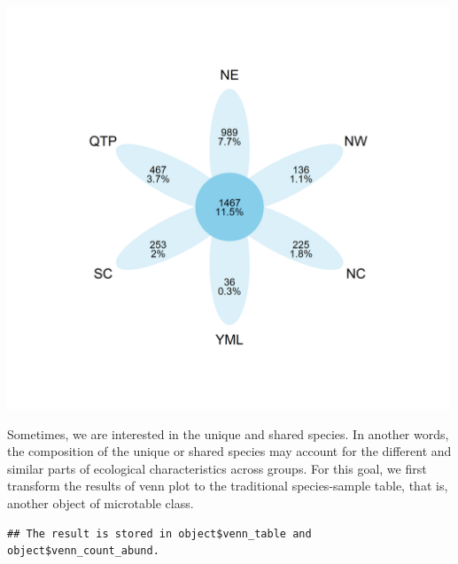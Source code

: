 \documentclass[
]{book}
\newenvironment{Shaded}{\begin{snugshade}}{\end{snugshade}}
\newcommand{\AttributeTok}[1]{\textcolor[rgb]{0.77,0.63,0.00}{#1}}
\newcommand{\CommentTok}[1]{\textcolor[rgb]{0.56,0.35,0.01}{\textit{#1}}}
\newcommand{\ConstantTok}[1]{\textcolor[rgb]{0.00,0.00,0.00}{#1}}
\newcommand{\FunctionTok}[1]{\textcolor[rgb]{0.00,0.00,0.00}{#1}}
\newcommand{\NormalTok}[1]{#1}
\newcommand{\OtherTok}[1]{\textcolor[rgb]{0.56,0.35,0.01}{#1}}
\newcommand{\SpecialCharTok}[1]{\textcolor[rgb]{0.00,0.00,0.00}{#1}}
\newcommand{\StringTok}[1]{\textcolor[rgb]{0.31,0.60,0.02}{#1}}
\begin{document}
\begin{center}\includegraphics[width=500px]{Images/trans_venn_2} \end{center}

Sometimes, we are interested in the unique and shared species. In another words,
the composition of the unique or shared species may account for the different and similar parts of ecological characteristics across groups\citep{Mendes_Deciphering_2011}.
For this goal, we first transform the results of venn plot to the traditional species-sample table, that is, another object of microtable class.

\begin{Shaded}
\end{Shaded}

\begin{verbatim}
## The result is stored in object$venn_table and object$venn_count_abund.
\end{verbatim}

\begin{Shaded}
\end{Shaded}
\end{document}
